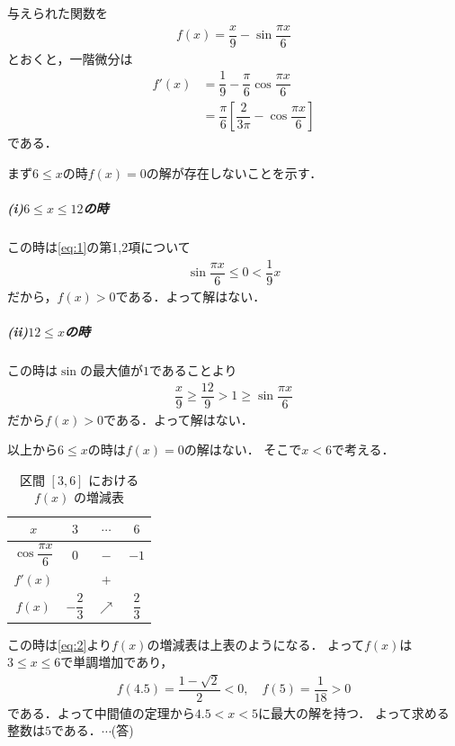 \documentclass[../../main.tex]{subfiles}
\begin{document}
与えられた関数を
\begin{align}
  f(x)=\dfrac{x}{9}-\sin\dfrac{\pi x}{6} \label{eq:1}
\end{align}
とおくと，一階微分は
\begin{align}
  f'(x)
  & = \dfrac{1}{9} - \dfrac{\pi}{6}\cos\dfrac{\pi x}{6} \\
  & = \dfrac{\pi}{6}\left[\dfrac{2}{3\pi}-\cos\dfrac{\pi x}{6}\right] \label{eq:2}
\end{align}
である．

まず$6\le x$の時$f(x)=0$の解が存在しないことを示す．

\subparagraph{(i)$6\le x\le12$の時}

この時は\cref{eq:1}の第1,2項について
\begin{align}
  \sin\dfrac{\pi x}{6}\le0<\dfrac{1}{9}x
\end{align}
だから，$f(x)>0$である．よって解はない．

\subparagraph{(ii)$12\le x$の時}

この時は$\sin$の最大値が$1$であることより
\begin{align}
  \dfrac{x}{9} \ge \dfrac{12}{9} > 1 \ge \sin\dfrac{\pi x}{6}
\end{align}
だから$f(x)>0$である．よって解はない．
\casesend

以上から$6 \le x $の時は$f(x)=0$の解はない．
そこで$x < 6$で考える．

\begin{table}[htb]
  \centering
  \caption{区間 $[3, 6]$ における $f(x)$ の増減表}
  \label{tab:fx_3_6}
  \begin{tabular}{|c|c|c|c|}
    \hline
    $x$ & $3$ & $\cdots$ & $6$ \\ \hline
    $\cos\dfrac{\pi x}{6}$ & $0$ & $-$ & $-1$ \\ \hline
    $f'(x)$ & & $+$ & \\ \hline
    $f(x)$ & $-\dfrac{2}{3}$ & $\nearrow$ & $\dfrac{2}{3}$ \\ \hline
  \end{tabular}
\end{table}

この時は\cref{eq:2}より$f(x)$の増減表は上表のようになる．
よって$f(x)$は$3\le x\le6$で単調増加であり，
\begin{align}
  f(4.5)=\dfrac{1-\sqrt{2}}{2}<0, \quad
  f(5)=\dfrac{1}{18}>0
\end{align}
である．よって中間値の定理から$4.5<x<5$に最大の解を持つ．
よって求める整数は$5$である．$\cdots$(答)
\newpage
\end{document}
